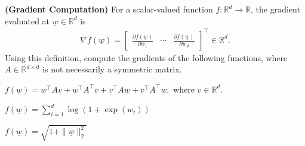 \documentclass{article}
\theoremstyle{definition}
\begin{document}
\begin{question}
	\item \textbf{(Gradient Computation)} For a scalar-valued function $f : \mathbb{R}^d \to \mathbb{R}$, the gradient evaluated at $\underline{w} \in \mathbb{R}^d$ is
	\begin{align*}
		\nabla f(\underline{w}) = \begin{bmatrix}
			\frac{\partial f(\underline{w})}{\partial w_1} & \cdots & \frac{\partial f(\underline{w})}{\partial w_d}
		\end{bmatrix}^\top \in \mathbb{R}^d.
	\end{align*}
	Using this definition, compute the gradients of the following functions, where $A \in \mathbb{R}^{d \times d}$ is not necessarily a symmetric matrix.
	\begin{question}
		\item $f(\underline{w}) = \underline{w}^\top A \underline{v} + \underline{w}^\top A^\top \underline{v} + \underline{v}^\top A \underline{w} + \underline{v}^\top A^\top \underline{w},$ where $\underline{v} \in \mathbb{R}^d$.
		\item $f(\underline{w}) = \sum_{i=1}^d \log(1 + \exp(w_i))$
		\item $f(\underline{w}) = \sqrt{1 + \|\underline{w}\|_2^2}$
	\end{question}
	

\end{question}
\end{document}
